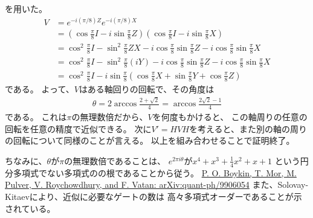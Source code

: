 \documentclass[]{ltjsarticle}
\begin{document}
を用いた。
\begin{align}
    V 
    &= 
    e^{-i(\pi/8)Z}e^{-i(\pi/8)X} \\
    &= 
    \left( 
        \cos\frac{\pi}{8}I - i\sin\frac{\pi}{8}Z
    \right)
    \left( 
        \cos\frac{\pi}{8}I - i\sin\frac{\pi}{8}X
    \right) \\
    &=
    \cos^2\frac{\pi}{8}I
    -
    \sin^2\frac{\pi}{8}ZX
    -
    i\cos\frac{\pi}{8}\sin\frac{\pi}{8}Z
    -
    i\cos\frac{\pi}{8}\sin\frac{\pi}{8}X \\
    &=
    \cos^2\frac{\pi}{8}I
    -
    \sin^2\frac{\pi}{8}(iY)
    -
    i\cos\frac{\pi}{8}\sin\frac{\pi}{8}Z
    -
    i\cos\frac{\pi}{8}\sin\frac{\pi}{8}X \\
    &=
    \cos^2\frac{\pi}{8}I
    -
    i\sin\frac{\pi}{8}
    \left(
        \cos\frac{\pi}{8} X
        +
        \sin\frac{\pi}{8} Y
        +
        \cos\frac{\pi}{8} Z
    \right)
\end{align}
である。
よって、$V$はある軸回りの回転で、その角度は
\begin{align}
    \theta 
    = 2\arccos\frac{2 + \sqrt{2}}{4}
    = \arccos \frac{2\sqrt{2}-1}{4}
\end{align}
である。
これは$\pi$の無理数倍だから、$V$を何度もかけると、
この軸周りの任意の回転を任意の精度で近似できる。
次に$V'=HVH$を考えると、また別の軸の周りの回転について同様のことが言える。
以上を組み合わせることで証明終了。

ちなみに、$\theta$が$\pi$の無理数倍であることは、
$e^{2\pi i \theta}$が$x^4 + x^3 + \frac{1}{4}x^2 + x + 1$
という円分多項式でない多項式のの根であることから従う。
\href{https://arxiv.org/abs/quant-ph/9906054}{
    P. O. Boykin, T. Mor, M. Pulver, V. Roychowdhury, and F. Vatan: 
    arXiv:quant-ph/9906054}
また、Solovay-Kitaevにより、近似に必要なゲートの数は
高々多項式オーダーであることが示されている。
\end{document}
